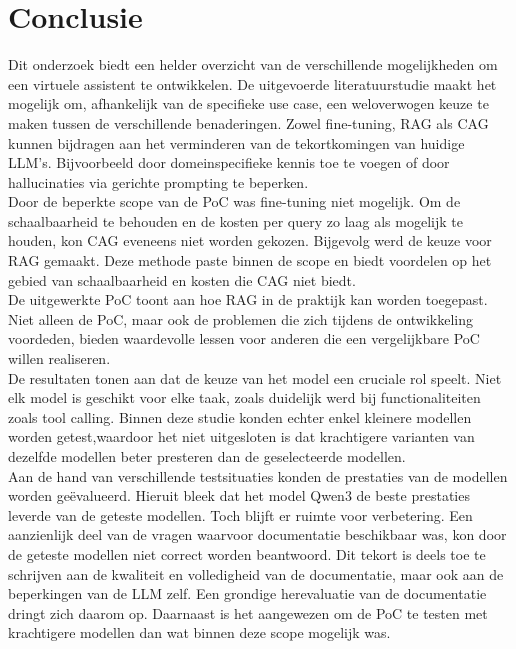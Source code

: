 
\chapter{Conclusie}%
\label{ch:conclusie}

Dit onderzoek biedt een helder overzicht van de verschillende mogelijkheden om een virtuele assistent te ontwikkelen. De uitgevoerde literatuurstudie maakt het mogelijk om, afhankelijk van de specifieke use case, een weloverwogen keuze te maken tussen de verschillende benaderingen. Zowel fine-tuning, RAG als CAG kunnen bijdragen aan het verminderen van de tekortkomingen van huidige LLM's. Bijvoorbeeld door domeinspecifieke kennis toe te voegen of door hallucinaties via gerichte prompting te beperken.
\\[1em]
Door de beperkte scope van de PoC was fine-tuning niet mogelijk. Om de schaalbaarheid te behouden en de kosten per query zo laag als mogelijk te houden, kon CAG eveneens niet worden gekozen. Bijgevolg werd de keuze voor RAG gemaakt. Deze methode paste binnen de scope en biedt voordelen op het gebied van schaalbaarheid en kosten die CAG niet biedt.
\\[1em]
De uitgewerkte PoC toont aan hoe RAG in de praktijk kan worden toegepast. Niet alleen de PoC, maar ook de problemen die zich tijdens de ontwikkeling voordeden, bieden waardevolle lessen voor anderen die een vergelijkbare PoC willen realiseren.
\\[1em]
De resultaten tonen aan dat de keuze van het model een cruciale rol speelt. Niet elk model is geschikt voor elke taak, zoals duidelijk werd bij functionaliteiten zoals tool calling. Binnen deze studie konden echter enkel kleinere modellen worden getest,waardoor het niet uitgesloten is dat krachtigere varianten van dezelfde modellen beter presteren dan de geselecteerde modellen.
\\[1em]
Aan de hand van verschillende testsituaties konden de prestaties van de modellen worden geëvalueerd. Hieruit bleek dat het model Qwen3 de beste prestaties leverde van de geteste modellen. Toch blijft er ruimte voor verbetering. Een aanzienlijk deel van de vragen waarvoor documentatie beschikbaar was, kon door de geteste modellen niet correct worden beantwoord. Dit tekort is deels toe te schrijven aan de kwaliteit en volledigheid van de documentatie, maar ook aan de beperkingen van de LLM zelf. Een grondige herevaluatie van de documentatie dringt zich daarom op. Daarnaast is het aangewezen om de PoC te testen met krachtigere modellen dan wat binnen deze scope mogelijk was.
